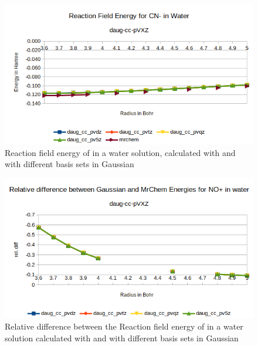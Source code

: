 \documentclass[../master_thesis.tex]{subfiles}
\begin{document}
\begin{figure}[!htb]
  \centering
    \includegraphics[width=\linewidth]{img/Erdaugcyan.png}
  \caption{Reaction field energy of  in a water solution, calculated with \mrchem
  and with different basis sets in Gaussian}
  \label{fig:cyanEnergyplotsdaug}
\end{figure}

\begin{figure}[!htb]
  \centering
    \includegraphics[width=\linewidth]{img/nopdaugreldiff.png}
    \caption{Relative difference between the Reaction field energy of  in a water solution calculated with \mrchem
  and with different basis sets in Gaussian}
  \label{fig:nopreldiffdaug}
\end{figure}
\end{document}
